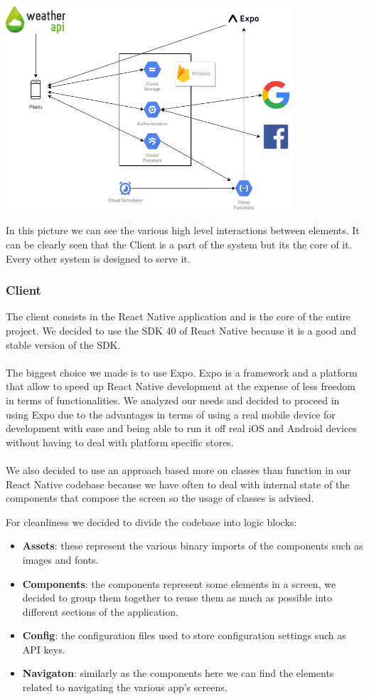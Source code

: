 \documentclass[10pt]{article}
\begin{document}
	\includegraphics[width=0.8\textwidth]{resources/plants_arch.png}
	
	In this picture we can see the various high level interactions between elements. It can be clearly seen that the Client is a part of the system but its the core of it. Every other system is designed to serve it.
	
	\subsubsection{Client}
	The client consists in the React Native application and is the core of the entire project. We decided to use the SDK 40 of React Native because it is a good and stable version of the SDK. \\\\ The biggest choice we made is to use Expo. Expo is a framework and a platform that allow to speed up React Native development at the expense of less freedom in terms of functionalities. We analyzed our needs and decided to proceed in using Expo due to the advantages in terms of using a real mobile device for development with ease and being able to run it off real iOS and Android devices without having to deal with platform specific stores. \\\\ We also decided to use an approach based more on classes than function in our React Native codebase because we have often to deal with internal state of the components that compose the screen so the usage of classes is advised.
	
	For cleanliness we decided to divide the codebase into logic blocks:
	\begin{itemize}
		\item \textbf{Assets}: these represent the various binary imports of the components such as images and fonts.
		\item \textbf{Components}: the components represent some elements in a screen, we decided to group them together to reuse them as much as possible into different sections of the application.
		\item \textbf{Config}: the configuration files used to store configuration settings such as API keys.
		\item \textbf{Navigaton}: similarly as the components here we can find the elements related to navigating the various app's screens.
	\end{itemize}
	
\end{document}

